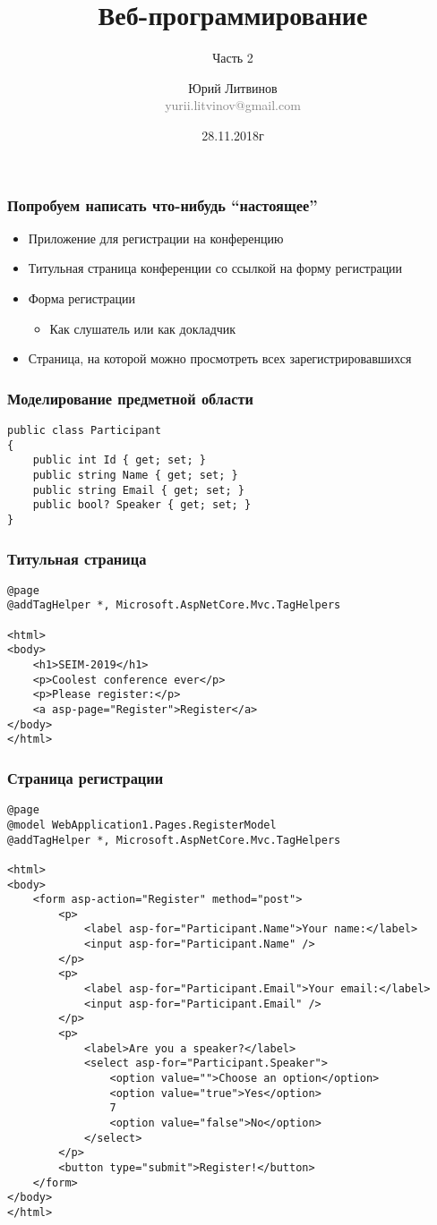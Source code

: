 \documentclass[xetex,mathserif,serif]{beamer}
\title{Веб-программирование}
\subtitle{Часть 2}
\author[Юрий Литвинов]{Юрий Литвинов\\\small{\textcolor{gray}{yurii.litvinov@gmail.com}}}
\date{28.11.2018г}
\begin{document}
	\frame{\titlepage}

	\begin{frame}
		\frametitle{Попробуем написать что-нибудь ``настоящее''}
		\begin{itemize}
			\item Приложение для регистрации на конференцию
			\item Титульная страница конференции со ссылкой на форму регистрации
			\item Форма регистрации
			\begin{itemize}
				\item Как слушатель или как докладчик
			\end{itemize}
			\item Страница, на которой можно просмотреть всех зарегистрировавшихся
		\end{itemize}
	\end{frame}

	\begin{frame}[fragile]
		\frametitle{Моделирование предметной области}
		\begin{verbatim}
public class Participant
{
    public int Id { get; set; }
    public string Name { get; set; }
    public string Email { get; set; }
    public bool? Speaker { get; set; }
}
		\end{verbatim}
	\end{frame}

	\begin{frame}[fragile]
		\frametitle{Титульная страница}
		\begin{verbatim}
@page
@addTagHelper *, Microsoft.AspNetCore.Mvc.TagHelpers

<html>
<body>
    <h1>SEIM-2019</h1>
    <p>Coolest conference ever</p>
    <p>Please register:</p>
    <a asp-page="Register">Register</a>
</body>
</html>
		\end{verbatim}
	\end{frame}

	\begin{frame}[fragile]
		\frametitle{Страница регистрации}
		\begin{ssmall}
			\begin{verbatim}
@page
@model WebApplication1.Pages.RegisterModel
@addTagHelper *, Microsoft.AspNetCore.Mvc.TagHelpers

<html>
<body>
    <form asp-action="Register" method="post">
        <p>
            <label asp-for="Participant.Name">Your name:</label>
            <input asp-for="Participant.Name" />
        </p>
        <p>
            <label asp-for="Participant.Email">Your email:</label>
            <input asp-for="Participant.Email" />
        </p>
        <p>
            <label>Are you a speaker?</label>
            <select asp-for="Participant.Speaker">
                <option value="">Choose an option</option>
                <option value="true">Yes</option>
                7
                <option value="false">No</option>
            </select>
        </p>
        <button type="submit">Register!</button>
    </form>
</body>
</html>
			\end{verbatim}
		\end{ssmall}
	\end{frame}
\end{document}
